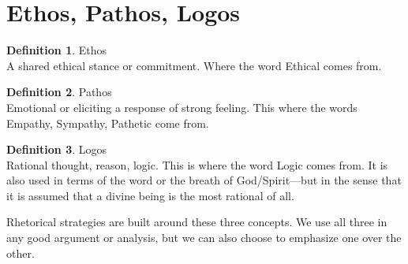 \documentclass[11pt,twoside,letterpaper]{article}
\theoremstyle{definition}
\newtheorem{definition}{Definition}
\begin{document}
\section{Ethos, Pathos, Logos}

\begin{definition}{\sc Ethos}\\
A shared ethical stance or commitment. Where the word {\sc Ethical} comes from.
\end{definition}

\begin{definition}{\sc Pathos}\\
Emotional or eliciting a response of strong feeling. This where the words {\sc Empathy, Sympathy, Pathetic} come from.
\end{definition}

\begin{definition}{\sc Logos}\\
Rational thought, reason, logic. This is where the word {\sc Logic} comes from. It is also used in terms of {\sc the word} or {\sc the breath} of God/Spirit---but in the sense that it is assumed that a divine being is the most rational of all.
\end{definition}

Rhetorical strategies are built around these three concepts. We use all three in any good argument or analysis, but we can also choose to emphasize one over the other.
\end{document}
